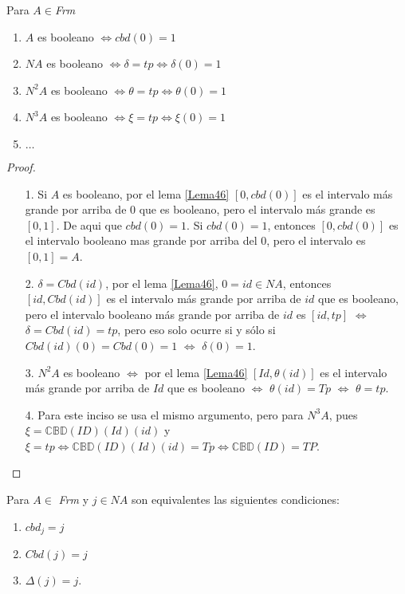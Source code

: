 \begin{thm}
Para $A\in$\textit{Frm}
\begin{enumerate}
\item $A$ es booleano $\Leftrightarrow cbd(0)=1$
\item $NA$ es booleano $\Leftrightarrow \delta=tp\Leftrightarrow\delta(0)=1$
\item $N^2A$ es booleano $\Leftrightarrow \theta=tp\Leftrightarrow\theta(0)=1$
\item $N^3A$ es booleano $\Leftrightarrow \xi=tp\Leftrightarrow\xi(0)=1$
\item $\ldots$
\end{enumerate}
\end{thm}

\begin{proof}
\begin{itemize}
\item[1.] Si $A$ es booleano, por el lema \ref{Lema46} $[0,cbd(0)]$ es el intervalo más grande por arriba de 0 que es booleano, pero el intervalo más grande es $[0,1]$. De aqui que $cbd(0)=1$. Si $cbd(0)=1$, entonces  $[0,cbd(0)]$ es el intervalo booleano mas grande por arriba del 0, pero el intervalo es $[0,1]=A$.
\item[2.] $\delta=Cbd(id)$, por el lema \ref{Lema46}, $0=id\in NA$, entonces $[id, Cbd(id)]$ es el intervalo más grande por arriba de $id$ que es booleano, pero el intervalo booleano más grande por arriba de $id$ es $[id, tp]$ $\Leftrightarrow$ $\delta=Cbd(id)=tp$, pero eso solo ocurre si y sólo si $Cbd(id)(0)=Cbd(0)=1$ $\Leftrightarrow$ $\delta(0)=1.$
\item[3.] $N^2A$ es booleano $\Leftrightarrow$ por el lema \ref{Lema46} $[Id, \theta(id)]$ es el intervalo más grande por arriba de $Id$ que es booleano $\Leftrightarrow$ $\theta(id)=Tp$ $\Leftrightarrow$ $\theta=tp$.
\item[4.] Para este inciso se usa el mismo argumento, pero para $N^3A$, pues $\xi=\mathbb{CBD}(ID)(Id)(id)$ y $\xi=tp\Leftrightarrow \mathbb{CBD}(ID)(Id)(id)=Tp\Leftrightarrow \mathbb{CBD}(ID)=TP$.
\end{itemize}
\end{proof}

\begin{thm}
Para $A\in$ \textit{Frm} y $j\in NA$ son equivalentes las siguientes condiciones:
\begin{enumerate}
\item $cbd_j=j$
\item $Cbd(j)=j$
\item $\Delta(j)=j$.
\end{enumerate}
\end{thm}

